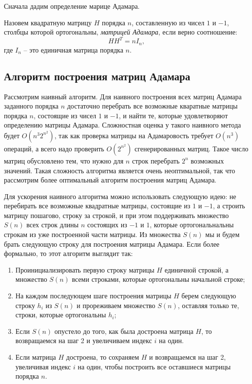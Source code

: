 \documentclass[a4paper, 14pt]{extreport}
\begin{document}
Сначала дадим определение марице Адамара.
\begin{Df}\normalfont\label{df:had_m}
    Назовем квадратную матрицу $H$ порядка $n$, составленную из чисел $1$ и $-1$, столбцы которой ортогональны, {\it матрицей Адамара}, если верно соотношение:
    \begin{equation}
        H H^T = n I_n,
    \end{equation}
    где $I_n$ -- это единичная матрица порядка $n$.
\end{Df}

\subsection{Алгоритм построения матриц Адамара}

Рассмотрим наивный алгоритм. Для наивного построения всех матриц Адамара заданного порядка $n$ достаточно перебрать все возможные кваратные матрицы порядка $n$, состоящие из чисел $1$ и $-1$, и найти те, которые удовлетворяют определению матрицы Адамара. Сложностная оценка у такого наивного метода будет $O(n^3 {2^{n^{2}}})$, так как проверка матрицы на Адамаровость требует $O(n^3)$ операций, а всего надо проверить $O({2^{n^{2}}})$ сгенерированных матриц. Такое число матриц обусловлено тем, что нужно для $n$ строк перебрать $2^n$ возможных значений. Такая сложность алгоритма является очень неоптимальной, так что рассмотрим более оптимальный алгоритм построения матриц Адамара.

Для ускорения наивного алгоритма можно использовать следующую идею: не перебирать все возможные квадратные матрицы, состоящие из $1$ и $-1$, а строить матрицу пошагово, строку за строкой, и при этом поддерживать множество $S(n)$ всех строк длины $n$ состоящих из $-1$ и $1$, которые ортогональнальны строкам из уже построенной части матрицы. Из множества $S(n)$ мы и будем брать следующую строку для построения матрицы Адамара. Если более формально, то этот алгоритм выглядит так:
\begin{enumerate}
    \item Проинициализировать первую строку матрицы $H$ единичной строкой, а множество $S(n)$ всеми строками, которые ортогональны начальной строке;
    \item На каждом последующем шаге построения матрицы $H$ берем следующую строку $h_i$ из $S(n)$ и прореживаем множество $S(n)$, оставляя только те, строки, которые ортогональны $h_i$;
    \item Если $S(n)$ опустело до того, как была достроена матрица $H$, то возвращаемся на шаг 2 и увеличиваем индекс $i$ на один.
    \item Если матрица $H$ достроена, то сохраняем $H$ и возвращаемся на шаг 2, увеличивая индекс $i$ на один, чтобы построить все оставшиеся матрицы порядка $n$.
\end{enumerate}
\end{document}
